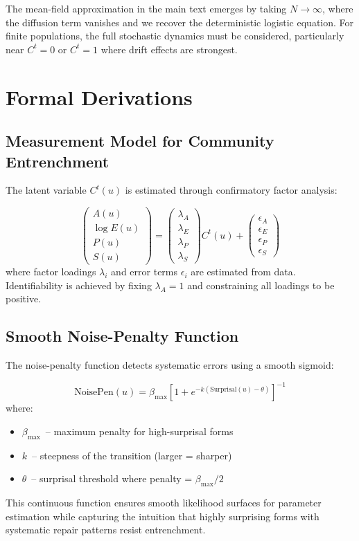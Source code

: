 \documentclass[12pt]{article}
\begin{document}
The mean-field approximation in the main text emerges by taking $N \to \infty$, where the diffusion term vanishes and we recover the deterministic logistic equation. For finite populations, the full stochastic dynamics must be considered, particularly near $C^t = 0$ or $C^t = 1$ where drift effects are strongest.

\section{Formal Derivations}

\subsection{Measurement Model for Community Entrenchment}

The latent variable $C^t(u)$ is estimated through confirmatory factor analysis:

\[
\begin{pmatrix}
A(u) \\
\log E(u) \\
P(u) \\
S(u)
\end{pmatrix}
=
\begin{pmatrix}
\lambda_A \\
\lambda_E \\
\lambda_P \\
\lambda_S
\end{pmatrix}
C^t(u) +
\begin{pmatrix}
\epsilon_A \\
\epsilon_E \\
\epsilon_P \\
\epsilon_S
\end{pmatrix}
\]
where factor loadings $\lambda_i$ and error terms $\epsilon_i$ are estimated from data. Identifiability is achieved by fixing $\lambda_A = 1$ and constraining all loadings to be positive.

\subsection{Smooth Noise-Penalty Function} \label{sec:noise-penalty}

The noise-penalty function detects systematic errors using a smooth sigmoid:

\[
\text{NoisePen}(u) = \beta_{\text{max}}\left[1 + e^{-k(\text{Surprisal}(u) - \theta)}\right]^{-1}
\]
where:
\begin{itemize}
\item $\beta_{\text{max}}$~-- maximum penalty for high-surprisal forms
\item $k$~-- steepness of the transition (larger = sharper)
\item $\theta$~-- surprisal threshold where penalty = $\beta_{\text{max}}/2$
\end{itemize}
This continuous function ensures smooth likelihood surfaces for parameter estimation while capturing the intuition that highly surprising forms with systematic repair patterns resist entrenchment.
\end{document}
